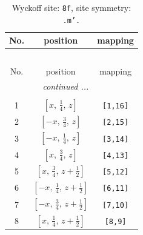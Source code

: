 \documentclass[fleqn,8pt]{jsarticle}
\begin{document}
\begin{longtable}{ccc}
\caption{Wyckoff site: {\tt 8f}, site symmetry: {\tt .m'.}}
 \\
 \hline \hline
No. & position & mapping \\ \hline \endfirsthead

\multicolumn{2}{l}{\tablename\ \thetable{}} \\
 \hline \hline
No. & position & mapping \\ \hline \endhead

 \hline \hline
\multicolumn{2}{r}{\footnotesize\it continued ...} \\ \endfoot

 \hline \hline
\multicolumn{2}{r}{} \\ \endlastfoot

1 & $\left[ x,\, \frac{1}{4},\, z \right]$ & {\tt [1,16]} \\ \hline
2 & $\left[ - x,\, \frac{3}{4},\, z \right]$ & {\tt [2,15]} \\ \hline
3 & $\left[ - x,\, \frac{1}{4},\, z \right]$ & {\tt [3,14]} \\ \hline
4 & $\left[ x,\, \frac{3}{4},\, z \right]$ & {\tt [4,13]} \\ \hline
5 & $\left[ x,\, \frac{3}{4},\, z + \frac{1}{2} \right]$ & {\tt [5,12]} \\ \hline
6 & $\left[ - x,\, \frac{1}{4},\, z + \frac{1}{2} \right]$ & {\tt [6,11]} \\ \hline
7 & $\left[ - x,\, \frac{3}{4},\, z + \frac{1}{2} \right]$ & {\tt [7,10]} \\ \hline
8 & $\left[ x,\, \frac{1}{4},\, z + \frac{1}{2} \right]$ & {\tt [8,9]} \\
\end{longtable}
\renewcommand{\arraystretch}{1.2}
\end{document}
